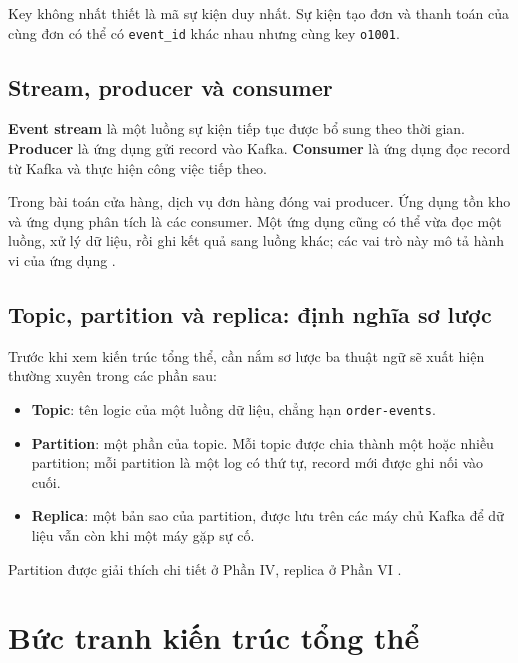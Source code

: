 Key không nhất thiết là mã sự kiện duy nhất. Sự kiện tạo đơn và thanh toán của cùng đơn có thể có \texttt{event\_\allowbreak{}id} khác nhau nhưng cùng key \texttt{o1001}.


\FloatBarrier
{}
\subsection{Stream, producer và consumer}

\textbf{Event stream} là một luồng sự kiện tiếp tục được bổ sung theo thời gian. \textbf{Producer} là ứng dụng gửi record vào Kafka. \textbf{Consumer} là ứng dụng đọc record từ Kafka và thực hiện công việc tiếp theo.


Trong bài toán cửa hàng, dịch vụ đơn hàng đóng vai producer. Ứng dụng tồn kho và ứng dụng phân tích là các consumer. Một ứng dụng cũng có thể vừa đọc một luồng, xử lý dữ liệu, rồi ghi kết quả sang luồng khác; các vai trò này mô tả hành vi của ứng dụng \cite{kafka-producer-api, kafka-consumer-api}.


\FloatBarrier
{}
\subsection{Topic, partition và replica: định nghĩa sơ lược}

Trước khi xem kiến trúc tổng thể, cần nắm sơ lược ba thuật ngữ sẽ xuất hiện thường xuyên trong các phần sau:

\begin{itemize}
\item \textbf{Topic}: tên logic của một luồng dữ liệu, chẳng hạn \texttt{order-\allowbreak{}events}.
\item \textbf{Partition}: một phần của topic. Mỗi topic được chia thành một hoặc nhiều partition; mỗi partition là một log có thứ tự, record mới được ghi nối vào cuối.
\item \textbf{Replica}: một bản sao của partition, được lưu trên các máy chủ Kafka để dữ liệu vẫn còn khi một máy gặp sự cố.
\end{itemize}

Partition được giải thích chi tiết ở Phần IV, replica ở Phần VI \cite{kafka-intro}.


\FloatBarrier
\Needspace{0.55\textheight}
\section{Bức tranh kiến trúc tổng thể}

